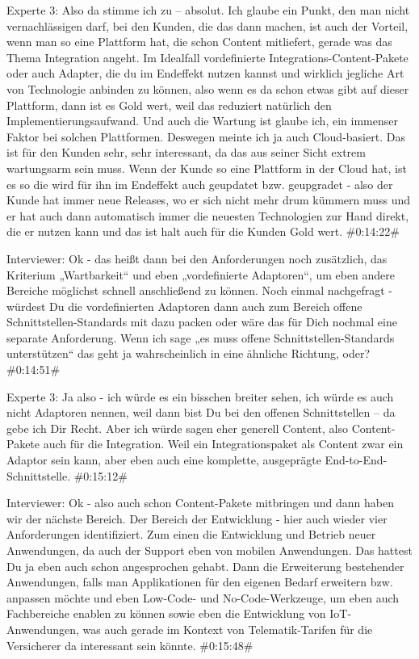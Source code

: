 Experte 3:
Also da stimme ich zu – absolut. Ich glaube ein Punkt, den man nicht vernachlässigen darf, bei den Kunden, die das dann machen, ist auch der Vorteil, wenn man so eine Plattform hat, die schon Content mitliefert, gerade was das Thema Integration angeht. Im Idealfall vordefinierte Integrations-Content-Pakete oder auch Adapter, die du im Endeffekt nutzen kannst und wirklich jegliche Art von Technologie anbinden zu können, also wenn es da schon etwas gibt auf dieser Plattform, dann ist es Gold wert, weil das reduziert natürlich den Implementierungsaufwand. Und auch die Wartung ist glaube ich, ein immenser Faktor bei solchen Plattformen. Deswegen meinte ich ja auch Cloud-basiert. Das ist für den Kunden sehr, sehr interessant, da das aus seiner Sicht extrem wartungsarm sein muss. Wenn der Kunde so eine Plattform in der Cloud hat, ist es so die wird für ihn im Endeffekt auch geupdatet bzw. geupgradet - also der Kunde hat immer neue Releases, wo er sich nicht mehr drum kümmern muss und er hat auch dann automatisch immer die neuesten Technologien zur Hand direkt, die er nutzen kann und das ist halt auch für die Kunden Gold wert.
\#0:14:22\#

Interviewer:
Ok -  das heißt dann bei den Anforderungen noch zusätzlich, das Kriterium „Wartbarkeit“ und eben „vordefinierte Adaptoren“, um eben andere Bereiche möglichst schnell anschließend zu können. Noch einmal nachgefragt - würdest Du die vordefinierten Adaptoren dann auch zum Bereich offene Schnittstellen-Standards mit dazu packen oder wäre das für Dich nochmal eine separate Anforderung. Wenn ich sage „es muss offene Schnittstellen-Standards unterstützen“ das geht ja wahrscheinlich in eine ähnliche Richtung, oder?
\#0:14:51\#

Experte 3:
Ja also - ich würde es ein bisschen breiter sehen, ich würde es auch nicht Adaptoren nennen, weil dann bist Du bei den offenen Schnittstellen – da gebe ich Dir Recht. Aber ich würde sagen eher generell Content, also Content-Pakete auch für die Integration. Weil ein Integrationspaket als Content zwar ein Adaptor sein kann, aber eben auch eine komplette, ausgeprägte End-to-End-Schnittstelle.
\#0:15:12\#

Interviewer:
Ok - also auch schon Content-Pakete mitbringen und dann haben wir der nächste Bereich. Der Bereich der Entwicklung - hier auch wieder vier Anforderungen identifiziert. Zum einen die Entwicklung und Betrieb neuer Anwendungen, da auch der Support eben von mobilen Anwendungen. Das hattest Du ja eben auch schon angesprochen gehabt. Dann die Erweiterung bestehender Anwendungen, falls man Applikationen für den eigenen Bedarf erweitern bzw. anpassen möchte und eben Low-Code- und No-Code-Werkzeuge, um eben auch Fachbereiche enablen zu können sowie eben die Entwicklung von IoT-Anwendungen, was auch gerade im Kontext von Telematik-Tarifen für die Versicherer da interessant sein könnte.
\#0:15:48\#

